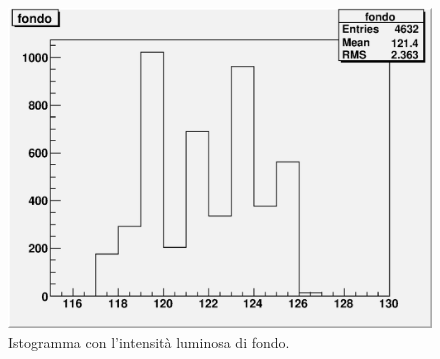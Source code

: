 \documentclass[italian,a4paper]{article}
\begin{document}
\begin{figure}[ph]\centering
\includegraphics[scale=.6]{fondo.scan.eps}
\caption{Istogramma con l'intensità luminosa di fondo.}\label{fondo_scan}
\end{figure}
\end{document}
